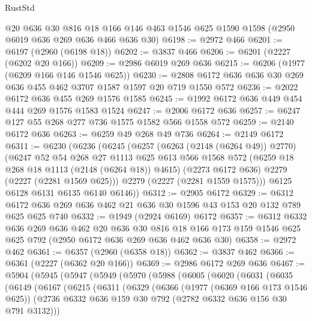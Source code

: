 \begin{lexlean}{RustStd}
\begin{coremodule}
    @20
    @636
    @30
    @816
    @18
    @166
    @146
    @463
    @1546
    @625
    @1590
    @1598
    (@2950 @6019 @636 @269 @636 @466 @636 @30)
@6198 := @2972 @466
@6201 := @6197 (@2960 (@6198 @18))
@6202 := @3837 @466
@6206 := @6201 (@2227 (@6202 @20 @166))
@6209 := @2986 @6019 @269 @636
@6215 := @6206 (@1977 (@6209 @166 @146 @1546 @625))
@6230 := @2808 @6172 @636 @636 @30 @269 @636 @455 @462 @3707 @1587 @1597 @20 @719 @1550 @572
@6236 := @2022 @6172 @636 @455 @269 @1576 @1585
@6245 := @1992 @6172 @636 @449 @454 @444 @269 @1576 @1583 @1524
@6247 := @2006 @6172 @636
@6257 := @6247 @127 @55 @268 @277 @736 @1575 @1582 @566 @1558 @572
@6259 := @2140 @6172 @636
@6263 := @6259 @49 @268 @49 @736
@6264 := @2149 @6172
@6311 := @6230
    (@6236
      (@6245
        (@6257
          (@6263 (@2148 (@6264 @49)) @2770)
          (@6247
            @52
            @54
            @268
            @27
            @1113
            @625
            @613
            @566
            @1568
            @572
            (@6259 @18 @268 @18 @1113 (@2148 (@6264 @18)) @4615)
            (@2273 @6172 @636)
            @2279
            (@2227 (@2281 @1569 @625)))
          @2279
          (@2227 (@2281 @1559 @1575)))
        @6125
        @6128
        @6131
        @6135
        @6140
        @6146))
@6312 := @2905 @6172
@6329 := @6312 @6172 @636 @269 @636 @462 @21 @636 @30 @1596 @43 @153 @20 @132 @789 @625 @625 @740
@6332 := @1949 (@2924 @6169) @6172
@6357 := @6312
    @6332
    @636
    @269
    @636
    @462
    @20
    @636
    @30
    @816
    @18
    @166
    @173
    @159
    @1546
    @625
    @625
    @792
    (@2950 @6172 @636 @269 @636 @462 @636 @30)
@6358 := @2972 @462
@6361 := @6357 (@2960 (@6358 @18))
@6362 := @3837 @462
@6366 := @6361 (@2227 (@6362 @20 @166))
@6369 := @2986 @6172 @269 @636
@6467 := @5904
    (@5945
      (@5947
        (@5949
          (@5970
            (@5988
              (@6005
                (@6020
                  (@6031
                    (@6035
                      (@6149
                        (@6167
                          (@6215
                            (@6311
                              (@6329
                                (@6366
                                  (@1977 (@6369 @166 @173 @1546 @625))
                                  (@2736
                                    @6332
                                    @636
                                    @159
                                    @30
                                    @792
                                    (@2782 @6332 @636 @156 @30 @791 @3132)))

\end{coremodule}
\end{lexlean}

